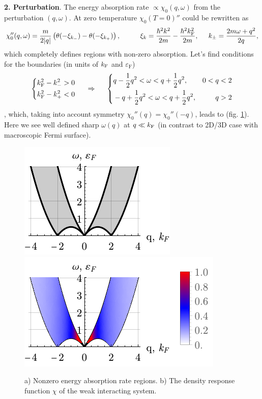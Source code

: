 \textbf{2. Perturbation}.  The energy absorption rate $\propto \chi_0 (q, \omega)$ from the perturbation $(q, \omega)$. At zero temperature $\chi_0(T=0)''$ could be rewritten as
\begin{equation*}
	\chi_0''(q,\omega) = \frac{m}{2|q|} \left(
		\theta(- \xi_{k_-}) - \theta(-\xi_{k_+})
	\right),
	\hspace{10 mm} 
	\xi_k = \frac{\hbar^2 k^2}{2m}  - \frac{\hbar^2 \kF^2}{2m},
	\hspace{5 mm} 
	k_{\pm} = \frac{2 m \omega + q^2}{2q},
\end{equation*}
which completely defines regions with non-zero absorption. Let's find conditions for the boundaries (in units of $k_{\textnormal{F}}$ and $\varepsilon_\text{F}$)
\begin{equation*}
	\left\{\begin{aligned}
	    k_{\textnormal{F}}^2 - k_-^2 &> 0 \\
	    k_{\textnormal{F}}^2 - k_+^2 &< 0 \\
	\end{aligned}\right.
	\hspace{0.5cm} \Rightarrow \hspace{0.5cm}
	\left\{\begin{aligned}
	    &q - \frac{1}{2}q^2  < \omega < q + \frac{1}{2} q^2, &0 < q< 2 \\
	    &-q + \frac{1}{2} q^2   < \omega < q + \frac{1}{2} q^2,  &q > 2
	\end{aligned}\right.
\end{equation*}
, which, taking into account symmetry $\chi_0''(q) = \chi_0''(-q)$, leads to (fig. \ref{fig:12_1}). 
Here we see well defined sharp $\omega(q)$ at $q \ll k_{\textnormal{F}}$ (in contrast to 2D/3D case with macroscopic Fermi surface).


\begin{figure}[h]
    \centering
    \includegraphics{imgs/mb12_1.pdf}
    \hspace{10 mm} 
	\includegraphics{imgs/mb12_2.pdf}
    \caption{a) Nonzero energy absorption rate regions.  b) The density response function $\chi$ of the weak interacting system. }
    \label{fig:12_1}
\end{figure}
